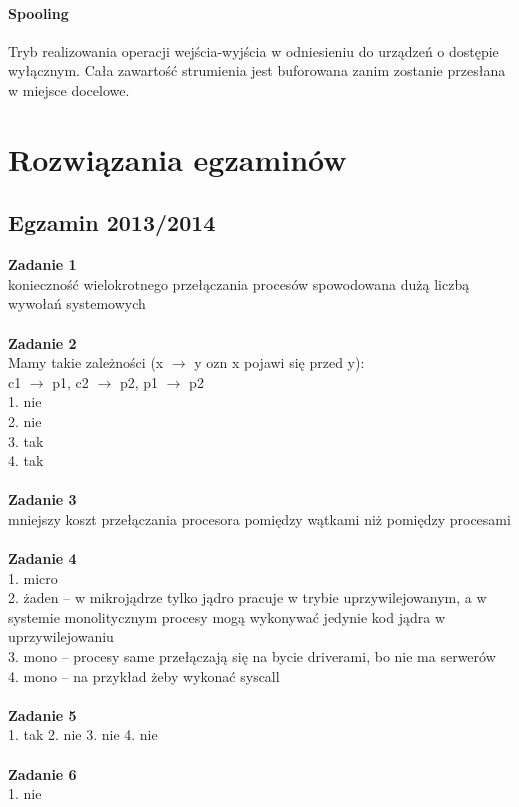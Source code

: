 \documentclass[12pt, a4paper, polish, openany]{book}
\begin{document}
\subsubsection{Spooling}
Tryb realizowania operacji wejścia-wyjścia w odniesieniu do urządzeń o dostępie wyłącznym. Cała zawartość strumienia jest buforowana zanim zostanie przesłana w miejsce docelowe.

\chapter{Rozwiązania egzaminów}
\section{Egzamin 2013/2014}
\textbf{Zadanie 1} \\
konieczność wielokrotnego przełączania procesów spowodowana dużą liczbą wywołań systemowych \\\\
\textbf{Zadanie 2} \\
Mamy takie zależności (x $\rightarrow$ y ozn x pojawi się przed y): \\
c1 $\rightarrow$ p1, c2 $\rightarrow$ p2, p1 $\rightarrow$ p2 \\
1. nie \\
2. nie \\
3. tak \\
4. tak
\\\\
\textbf{Zadanie 3} \\
mniejszy koszt przełączania procesora pomiędzy wątkami niż pomiędzy procesami \\\\
\textbf{Zadanie 4} \\
1. micro \\
2. żaden – w mikrojądrze tylko jądro pracuje w trybie uprzywilejowanym, a w systemie monolitycznym procesy mogą wykonywać jedynie kod jądra w uprzywilejowaniu \\
3. mono – procesy same przełączają się na bycie driverami, bo nie ma serwerów \\
4. mono – na przykład żeby wykonać syscall \\\\
\textbf{Zadanie 5} \\
1. tak
2. nie
3. nie
4. nie \\\\
\textbf{Zadanie 6} \\
1. nie \\
\end{document}
